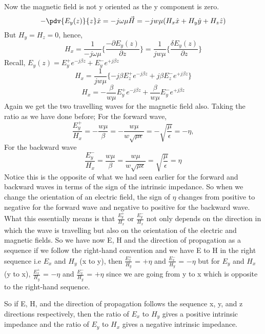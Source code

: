 Now the magnetic field is not y oriented as the y component is zero.
\begin{dmath*}
-\pdv{E_y(z)}{z}\hat{x} = -j\omega\mu\vec{H} = -jw\mu (H_x\hat{x} + H_y\hat{y} + H_z\hat{z}) 
\end{dmath*}
But	$H_y = H_z = 0$, hence,
\begin{dmath*}
H_x = \frac{1}{-j\omega\mu}\{\frac{-\partial E_y(z)}{\partial z}\} = \frac{1}{jw\mu}\{\frac{\delta E_y(z)}{\partial z}\}
\end{dmath*} 
Recall,
$E_y(z) = E_y^+ e^{-j\beta z} + E_y^- e^{+j\beta z}$
\begin{dmath*}
H_x= \frac{1}{jw\mu} \{-j\beta E_z^+e^{-j\beta z} + j\beta E_z^-e^{+j\beta z} \}
\end{dmath*}
\begin{dmath*}
H_x = - \frac{\beta}{w\mu} E_y^+e^{-j\beta z} +\frac{\beta}{w\mu}E_y^-e^{+j\beta z}
\end{dmath*}
Again we get the two travelling waves for the magnetic field also. Taking the ratio as we have done before; 
For the forward wave,
\begin{dmath*}
\frac{E_y^+}{H_x} = -\frac{w\mu}{\beta} = -\frac{w\mu}{w\sqrt{\mu \epsilon}} = -\sqrt{\frac{\mu}{\epsilon}} = -\eta,
\end{dmath*}
For the backward wave
\begin{dmath*}
\frac{E_y^-}{H_x} = \frac{w\mu}{\beta} = \frac{w\mu}{w\sqrt{\mu \epsilon}} = \sqrt{\frac{\mu}{\epsilon}} = \eta
\end{dmath*}
Notice this is the opposite of what we had seen earlier for the forward and backward waves in terms of the sign of the intrinsic impedance. So when we change the orientation of an electric field, the sign of $\eta$ changes from positive to negative for the forward wave and negative to positive for the backward wave. What this essentially means is that $\frac{E_y^+}{H_x}$ or $\frac{E_y^-}{H_x}$ not only depends on the direction in which the wave is travelling but also on the orientation of the electric and magnetic fields. So we have now E, H and the direction of propagation as a sequence if we follow the right-hand convention and we have E to H in the right sequence i.e $E_x$ and $H_y$ (x to y), then $\frac{E_x^+}{H_y}$ = $+\eta$ and $\frac{E_x^-}{H_y}$ = $-\eta$ but for $E_y$ and $H_x$ (y to x), $\frac{E_x^+}{H_y}$ = $-\eta$ and $\frac{E_x^-}{H_y}$ = $+\eta$ since we are going from y to x which is opposite to the right-hand sequence.

So if E, H, and the direction of propagation follows the sequence x, y, and z directions respectively, then the ratio of $E_x$ to $H_y$ gives a positive intrinsic impedance and the ratio of $E_y$ to $H_x$ gives a negative intrinsic impedance. 

